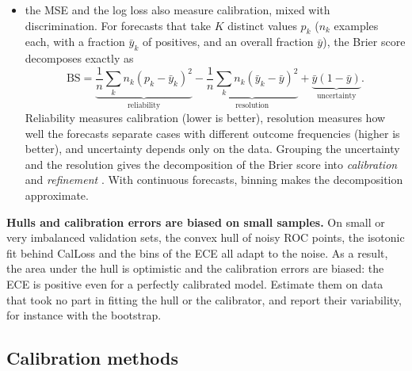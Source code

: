\begin{itemize}
        computed on evaluation data is a diagnostic; a calibrator to deploy must be fitted on
        separate calibration data;
  \item the MSE and the log loss also measure calibration, mixed with discrimination. For
        forecasts that take $K$ distinct values $p_k$ ($n_k$ examples each, with a fraction
        $\bar y_k$ of positives, and an overall fraction $\bar y$), the Brier score decomposes
        exactly \citep{murphy1973new} as
        \begin{equation}\label{eq:murphy}
          \mathrm{BS}=\underbrace{\frac1n\sum_k n_k(p_k-\bar y_k)^2}_{\text{reliability}}
                     -\underbrace{\frac1n\sum_k n_k(\bar y_k-\bar y)^2}_{\text{resolution}}
                     +\underbrace{\bar y(1-\bar y)}_{\text{uncertainty}}.
        \end{equation}
        Reliability measures calibration (lower is better), resolution measures how well the
        forecasts separate cases with different outcome frequencies (higher is better), and
        uncertainty depends only on the data. Grouping the uncertainty and the resolution
        gives the decomposition of the Brier score into \emph{calibration} and
        \emph{refinement} \citep{degroot1983comparison}. With continuous forecasts, binning
        makes the decomposition approximate.
\end{itemize}

\begin{pitfall}
\textbf{Hulls and calibration errors are biased on small samples.} On small or very imbalanced validation sets, the
convex hull of noisy ROC points, the isotonic fit behind CalLoss and the bins of the ECE all adapt to the noise. As a result,
the area under the hull is optimistic and the calibration errors are biased: the ECE is positive even for a
perfectly calibrated model. Estimate them on data that took no part in fitting the hull or the calibrator, and
report their variability, for instance with the bootstrap.
\end{pitfall}

\subsection{Calibration methods}

